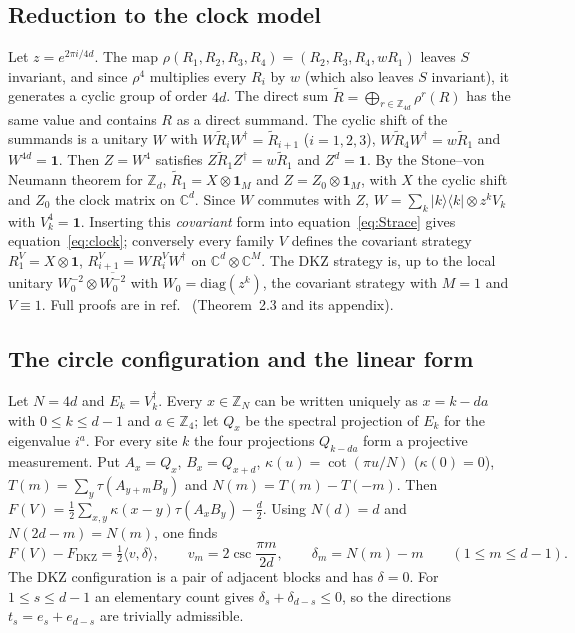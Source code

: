 \documentclass[11pt]{article}
\newcommand{\C}{\mathbb{C}}
\newcommand{\Z}{\mathbb{Z}}
\newcommand{\one}{\mathbf{1}}
\newcommand{\FD}{F_{\mathrm{DKZ}}}
\begin{document}
\subsection*{Reduction to the clock model}
Let $z=e^{2\pi i/4d}$. The map $\rho(R_1,R_2,R_3,R_4)=(R_2,R_3,R_4,wR_1)$ leaves $S$ invariant, and since $\rho^4$
multiplies every $R_i$ by $w$ (which also leaves $S$ invariant), it generates a cyclic group of order $4d$. The direct
sum $\tilde R=\bigoplus_{r\in\Z_{4d}}\rho^r(R)$ has
the same value and contains $R$ as a direct summand. The cyclic shift of the summands is a unitary $W$ with
$W\tilde R_iW^\dagger=\tilde R_{i+1}$ ($i=1,2,3$), $W\tilde R_4W^\dagger=w\tilde R_1$ and $W^{4d}=\one$. Then
$Z=W^4$ satisfies $Z\tilde R_1Z^\dagger=w\tilde R_1$ and $Z^d=\one$. By the Stone--von Neumann theorem for $\Z_d$,
$\tilde R_1=X\otimes\one_M$ and $Z=Z_0\otimes\one_M$, with $X$ the cyclic shift and $Z_0$ the clock matrix on $\C^d$.
Since $W$ commutes with $Z$, $W=\sum_k|k\rangle\langle k|\otimes z^kV_k$ with $V_k^4=\one$. Inserting this
\emph{covariant} form into equation~\eqref{eq:Strace} gives equation~\eqref{eq:clock}; conversely every family $V$
defines the covariant strategy $R^V_1=X\otimes\one$, $R^V_{i+1}=WR^V_iW^\dagger$ on $\C^d\otimes\C^M$. The DKZ
strategy is, up to the local unitary $W_0^{-2}\otimes\overline{W_0^{-2}}$ with $W_0=\mathrm{diag}(z^k)$, the covariant
strategy with $M=1$ and $V\equiv1$. Full proofs are in ref.~ (Theorem~2.3 and its appendix).

\subsection*{The circle configuration and the linear form}
Let $N=4d$ and $E_k=V_k^\dagger$. Every $x\in\Z_N$ can be written uniquely as $x=k-da$ with $0\le k\le d-1$ and
$a\in\Z_4$; let $Q_x$ be the spectral projection of $E_k$ for the eigenvalue $i^a$. For every site $k$ the four
projections $Q_{k-da}$ form a projective measurement. Put $A_x=Q_x$, $B_x=Q_{x+d}$, $\kappa(u)=\cot(\pi u/N)$
($\kappa(0)=0$), $T(m)=\sum_y\tau(A_{y+m}B_y)$ and $N(m)=T(m)-T(-m)$. Then $F(V)=\frac12\sum_{x,y}\kappa(x-y)\tau(A_xB_y)
-\frac d2$. Using $N(d)=d$ and $N(2d-m)=N(m)$, one finds
\begin{equation}\label{eq:linear}
F(V)-\FD=\tfrac12\langle v,\delta\rangle,\qquad v_m=2\csc\frac{\pi m}{2d},\qquad\delta_m=N(m)-m\qquad(1\le m\le d-1).
\end{equation}
The DKZ configuration is a pair of adjacent blocks and has $\delta=0$. For $1\le s\le d-1$ an elementary count gives
$\delta_s+\delta_{d-s}\le0$, so the directions $t_s=e_s+e_{d-s}$ are trivially admissible.
\end{document}
